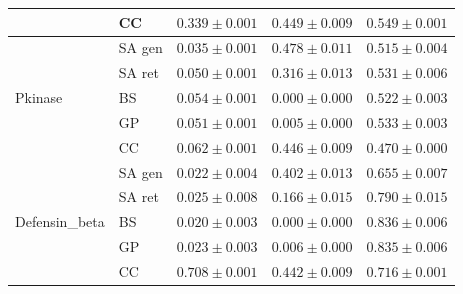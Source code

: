 \documentclass[10pt]{article}
\begin{document}
\begin{table}[ht]
\begin{tabular}{@{}llccc@{}}
 & CC      & $0.339 \pm 0.001$ & $0.449 \pm 0.009$ & $0.549 \pm 0.001$ \\
\midrule
\multirow{5}{*}{Pkinase}
 & SA gen  & $\mathbf{0.035 \pm 0.001}$ & $\mathbf{0.478 \pm 0.011}$ & $0.515 \pm 0.004$ \\
 & SA ret  & $0.050 \pm 0.001$ & $0.316 \pm 0.013$ & $0.531 \pm 0.006$ \\
 & BS      & $0.054 \pm 0.001$ & $0.000 \pm 0.000$ & $0.522 \pm 0.003$ \\
 & GP      & $0.051 \pm 0.001$ & $0.005 \pm 0.000$ & $0.533 \pm 0.003$ \\
 & CC      & $0.062 \pm 0.001$ & $0.446 \pm 0.009$ & $\mathbf{0.470 \pm 0.000}$ \\
\midrule
\multirow{5}{*}{Defensin\_beta}
 & SA gen  & $\mathbf{0.022 \pm 0.004}$ & $\mathbf{0.402 \pm 0.013}$ & $\mathbf{0.655 \pm 0.007}$ \\
 & SA ret  & $0.025 \pm 0.008$ & $0.166 \pm 0.015$ & $0.790 \pm 0.015$ \\
 & BS      & $0.020 \pm 0.003$ & $0.000 \pm 0.000$ & $0.836 \pm 0.006$ \\
 & GP      & $0.023 \pm 0.003$ & $0.006 \pm 0.000$ & $0.835 \pm 0.006$ \\
 & CC      & $0.708 \pm 0.001$ & $0.442 \pm 0.009$ & $0.716 \pm 0.001$ \\
\bottomrule
\end{tabular}
\end{table}
\end{document}
